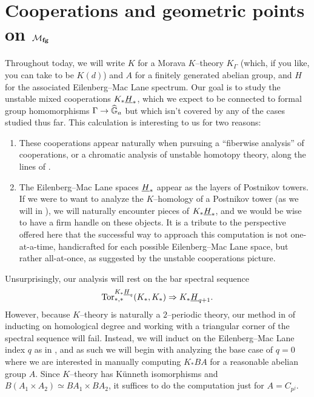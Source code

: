 \section{Cooperations and geometric points on $\mathcal{M}_{\mathbf{fg}}$}

Throughout today, we will write $K$ for a Morava $K$--theory $K_\Gamma$ (which, if you like, you can take to be $K(d)$) and $A$ for a finitely generated abelian group, and $H$ for the associated Eilenberg--Mac Lane spectrum.  Our goal is to study the unstable mixed cooperations $K_* \underline{\smash{H}}_{*}$, which we expect to be connected to formal group homomorphisms $\Gamma \to \widehat{\mathbb G}_a$ but which isn't covered by any of the cases studied thus far.  This calculation is interesting to us for two reasons:
\begin{enumerate}
\item These cooperations appear naturally when pursuing a ``fiberwise analysis'' of cooperations, or a chromatic analysis of unstable homotopy theory, along the lines of .
\item The Eilenberg--Mac Lane spaces $\underline{\smash{H}}_{*}$ appear as the layers of Postnikov towers.  If we were to want to analyze the $K$--homology of a Postnikov tower (as we will in ), we will naturally encounter pieces of $K_* \underline{\smash{H}}_{*}$, and we would be wise to have a firm handle on these objects.  It is a tribute to the perspective offered here that the successful way to approach this computation is not one-at-a-time, handicrafted for each possible Eilenberg--Mac Lane space, but rather all-at-once, as suggested by the unstable cooperations picture.
\end{enumerate}

Unsurprisingly, our analysis will rest on the bar spectral sequence \[\operatorname{Tor}^{K_* \underline{\smash{H}}_{q}}_{*, *}(K_*, K_*) \Rightarrow K_* \underline{\smash{H}}_{q+1}.\]  However, because $K$--theory is naturally a $2$--periodic theory, our method in  of inducting on homological degree and working with a triangular corner of the spectral sequence will fail.  Instead, we will induct on the Eilenberg--Mac Lane index $q$ as in , and as such we will begin with analyzing the base case of $q = 0$ where we are interested in manually computing $K_* BA$ for a reasonable abelian group $A$.  Since $K$--theory has K\"unneth isomorphisms and $B(A_1 \times A_2) \simeq BA_1 \times BA_2$, it suffices to do the computation just for $A = C_{p^j}$.

